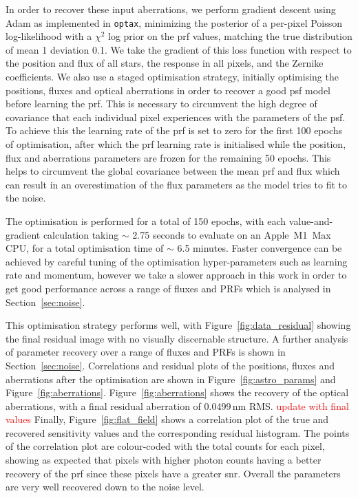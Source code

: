 \documentclass[]{spieman}
\newcommand\optax{\texttt{optax}\xspace}
\begin{document}
In order to recover these input aberrations, we perform gradient descent using Adam \cite{Kingma2014} as implemented in \optax \cite{optax2020github}, minimizing the posterior of a per-pixel Poisson log-likelihood with a $\chi^2$ log prior on the \ac{prf} values, matching the true distribution of mean 1 deviation 0.1. We take the gradient of this loss function with respect to the position and flux of all stars, the response in all pixels, and the Zernike coefficients. We also use a staged optimisation strategy, initially optimising the positions, fluxes and optical aberrations in order to recover a good \ac{psf} model before learning the \ac{prf}. This is necessary to circumvent the high degree of covariance that each individual pixel experiences with the parameters of the \ac{psf}. To achieve this the learning rate of the \ac{prf} is set to zero for the first 100 epochs of optimisation, after which the \ac{prf} learning rate is initialised while the position, flux and aberrations parameters are frozen for the remaining 50 epochs. This helps to circumvent the global covariance between the mean \ac{prf} and flux which can result in an overestimation of the flux parameters as the model tries to fit to the noise.

The optimisation is performed for a total of 150 epochs, with each value-and-gradient calculation taking $\sim$ 2.75 seconds to evaluate on an Apple~M1~Max CPU, for a total optimisation time of $\sim$ 6.5 minutes. Faster convergence can be achieved by careful tuning of the optimisation hyper-parameters such as learning rate and momentum, however we take a slower approach in this work in order to get good performance across a range of fluxes and PRFs which is analysed in Section~\ref{sec:noise}.

This optimisation strategy performs well, with Figure~\ref{fig:data_residual} showing the final residual image with no visually discernable structure. A further analysis of parameter recovery over a range of fluxes and PRFs is shown in Section~\ref{sec:noise}. Correlations and residual plots of the positions, fluxes and aberrations after the optimisation are shown in Figure~\ref{fig:astro_params} and Figure~\ref{fig:aberrations}. Figure~\ref{fig:aberrations} shows the recovery of the optical aberrations, with a final residual aberration of 
0.0499\,nm RMS. \textcolor{red}{update with final values}
Finally, Figure~\ref{fig:flat_field} shows a correlation plot of the true and recovered sensitivity values and the corresponding residual histogram. The points of the correlation plot are colour-coded with the total counts for each pixel, showing as expected that pixels with higher photon counts having a better recovery of the \ac{prf} since these pixels have a greater \ac{snr}. Overall the parameters are very well recovered down to the noise level.
\end{document}
